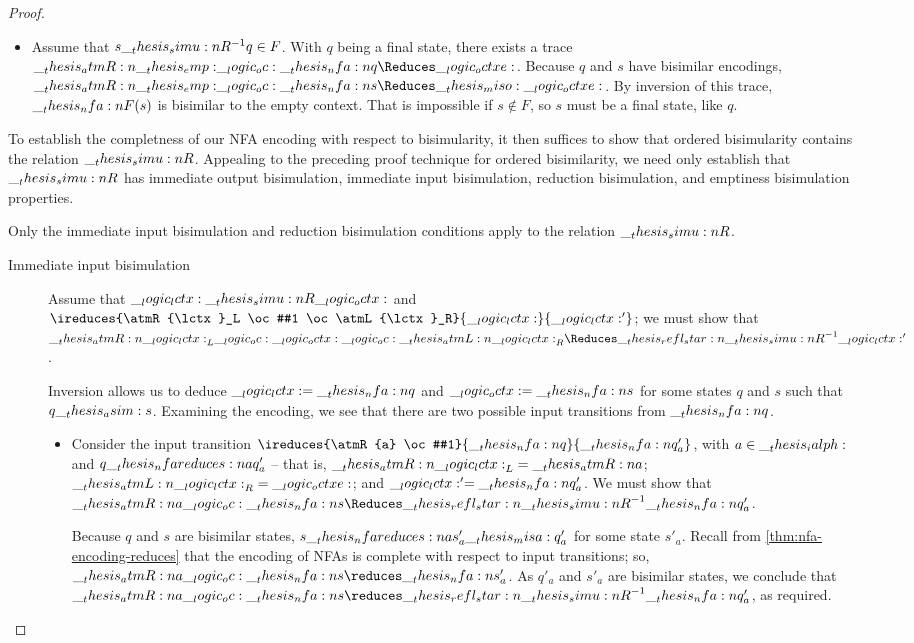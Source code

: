 \begin{proof}
\begin{itemize}
  \item Assume that $s \__thesis_simu:n {R}^{-1} q \in F$.
    With $q$ being a final state, there exists a trace $\atmR{\emp} \oc \nfa{q} \Reduces \octxe$.
    Because $q$ and $s$ have bisimilar encodings, $\atmR{\emp} \oc \nfa{s} \Reduces\miso \octxe$.
    By inversion of this trace, $\__thesis_nfa:n {F}(s)$ is bisimilar to the empty context.
    That is impossible if $s \notin F$, so $s$ must be a final state, like $q$.
  \end{itemize}

  To establish the completness of our \ac{NFA} encoding with respect to bisimularity, it then suffices to show that ordered bisimularity contains the relation $\__thesis_simu:n {R}$.
  Appealing to the preceding proof technique for ordered bisimilarity, we need only establish that $\__thesis_simu:n {R}$ has immediate output bisimulation, immediate input bisimulation, reduction bisimulation, and emptiness bisimulation properties.

  Only the immediate input bisimulation and reduction bisimulation conditions apply to the relation $\__thesis_simu:n {R}$.
  \begin{description}
  \item[Immediate input bisimulation]
    Assume that $\__logic_lctx: \__thesis_simu:n {R} \__logic_octx:$ and $\ireduces{\atmR{\lctx}_L \oc #1 \oc \atmL{\lctx}_R}{\lctx}{\lctx'}$;
    we must show that $\atmR{\lctx}_L \oc \octx \oc \atmL{\lctx}_R \Reduces\refl*{\simu{R}}^{-1} \lctx'$.

    Inversion allows us to deduce $\__logic_lctx: = \__thesis_nfa:n {q}$ and $\__logic_octx: = \__thesis_nfa:n {s}$ for some states $q$ and $s$ such that $q \__thesis_asim: s$.
    Examining the encoding, we see that there are two possible input transitions from $\__thesis_nfa:n {q}$.
    \begin{itemize}
    \item Consider the input transition $\ireduces{\atmR{a} \oc #1}{\nfa{q}}{\nfa{q}'_a}$, with $a \in \__thesis_ialph:$ and $q \nfareduces[a] q'_a$ -- that is, $\__thesis_atmR:n {\__logic_lctx:}_L = \__thesis_atmR:n {a}$; $\__thesis_atmL:n {\__logic_lctx:}_R = \__logic_octxe:$; and $\__logic_lctx:' = \__thesis_nfa:n {q}'_a$.
      We must show that $\atmR{a} \oc \nfa{s} \Reduces\refl*{\simu{R}}^{-1} \nfa{q}'_a$.

      Because $q$ and $s$ are bisimilar states, $s \nfareduces[a] s'_a \misa q'_a$ for some state $s'_a$.
      Recall from \cref{thm:nfa-encoding-reduces} that the encoding of \acp{NFA} is complete with respect to input transitions; so, $\atmR{a} \oc \nfa{s} \reduces \nfa{s}'_a$.
      As $q'_a$ and $s'_a$ are bisimilar states, we conclude that $\atmR{a} \oc \nfa{s} \reduces\refl*{\simu{R}}^{-1} \nfa{q}'_a$, as required.


\end{itemize}
\end{description}
\end{proof}
